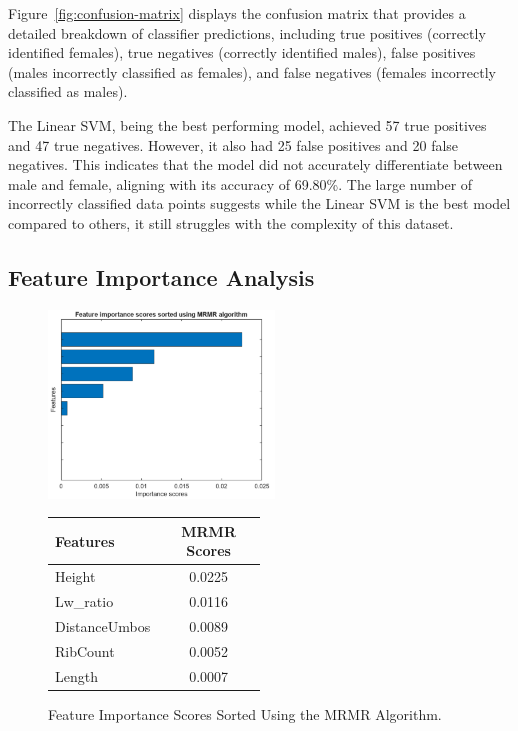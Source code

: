 Figure~\ref{fig:confusion-matrix} displays the confusion matrix that provides a detailed breakdown of classifier predictions, including true positives (correctly identified females), true negatives (correctly identified males), false positives (males incorrectly classified as females), and false negatives (females incorrectly classified as males).

The Linear SVM, being the best performing model, achieved 57 true positives and 47 true negatives. However, it also had 25 false positives and 20 false negatives. This indicates that the model did not accurately differentiate between male and female, aligning with its accuracy of 69.80\%. The large number of incorrectly classified data points suggests while the Linear SVM is the best model compared to others, it still struggles with the complexity of this dataset. 

\newpage
\subsection{Feature Importance Analysis}

\begin{figure}[!htbp]
	\centering
	\begin{minipage}{0.48\textwidth} 
		\centering
		\includegraphics[width=\textwidth, height=5cm]{figures/mrmr.png} 
	\end{minipage}%
	\hfill 
	\begin{minipage}{0.48\textwidth} 
		\centering
		{\fontsize{12}{15}\selectfont 
			\begin{tabular}{p{0.5\linewidth}c}
				\hline
				\textbf{Features} & \textbf{MRMR Scores} \\ \hline
				Height              & 0.0225  \\
				Lw\_ratio           & 0.0116  \\
				DistanceUmbos       & 0.0089  \\
				RibCount            & 0.0052  \\
				Length              & 0.0007  \\
				\hline
			\end{tabular}
		}
	\end{minipage}
	\caption{Feature Importance Scores Sorted Using the MRMR Algorithm.}
	\label{fig:mrmr-combined}
\end{figure}

